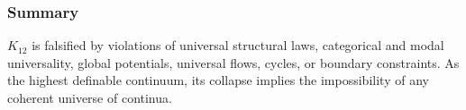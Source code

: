 \subsubsection{Summary}

$K_{12}$ is falsified by violations of universal structural laws,
categorical and modal universality, global potentials, universal flows,
cycles, or boundary constraints. As the highest definable continuum,
its collapse implies the impossibility of any coherent universe of
continua.
